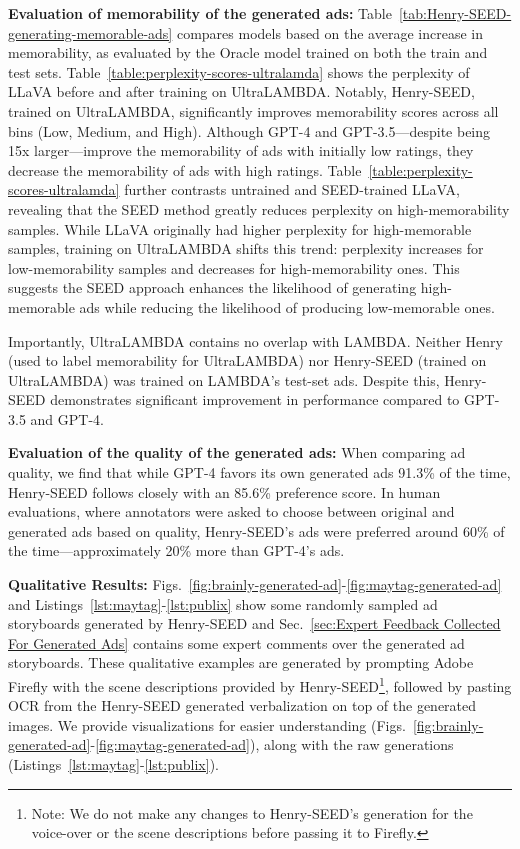 \textbf{Evaluation of memorability of the generated ads:} 
Table~\ref{tab:Henry-SEED-generating-memorable-ads} compares models based on the average increase in memorability, as evaluated by the Oracle model trained on both the train and test sets. Table~\ref{table:perplexity-scores-ultralamda} shows the perplexity of LLaVA before and after training on UltraLAMBDA. Notably, Henry-SEED, trained on UltraLAMBDA, significantly improves memorability scores across all bins (Low, Medium, and High). Although GPT-4 and GPT-3.5—despite being 15x larger—improve the memorability of ads with initially low ratings, they decrease the memorability of ads with high ratings. Table~\ref{table:perplexity-scores-ultralamda} further contrasts untrained and SEED-trained LLaVA, revealing that the SEED method greatly reduces perplexity on high-memorability samples. While LLaVA originally had higher perplexity for high-memorable samples, training on UltraLAMBDA shifts this trend: perplexity increases for low-memorability samples and decreases for high-memorability ones. This suggests the SEED approach enhances the likelihood of generating high-memorable ads while reducing the likelihood of producing low-memorable ones.


Importantly, UltraLAMBDA contains no overlap with LAMBDA. Neither Henry (used to label memorability for UltraLAMBDA) nor Henry-SEED (trained on UltraLAMBDA) was trained on LAMBDA’s test-set ads. Despite this, Henry-SEED demonstrates significant improvement in performance compared to GPT-3.5 and GPT-4.


\textbf{Evaluation of the quality of the generated ads:}
When comparing ad quality, we find that while GPT-4 favors its own generated ads 91.3\% of the time, Henry-SEED follows closely with an 85.6\% preference score. In human evaluations, where annotators were asked to choose between original and generated ads based on quality, Henry-SEED's ads were preferred around 60\% of the time—approximately 20\% more than GPT-4's ads.


\textbf{Qualitative Results:} Figs.~\ref{fig:brainly-generated-ad}-\ref{fig:maytag-generated-ad} and Listings~\ref{lst:maytag}-\ref{lst:publix} show some randomly sampled ad storyboards generated by Henry-SEED and Sec.~\ref{sec:Expert Feedback Collected For Generated Ads} contains some expert comments over the generated ad storyboards. These qualitative examples are generated by prompting Adobe Firefly \cite{adobefirefly} with the scene descriptions provided by Henry-SEED\footnote{Note: We do not make any changes to Henry-SEED's generation for the voice-over or the scene descriptions before passing it to Firefly.}, followed by pasting OCR from the Henry-SEED generated verbalization on top of the generated images. %
We provide visualizations for easier understanding (Figs.~\ref{fig:brainly-generated-ad}-\ref{fig:maytag-generated-ad}), along with the raw generations (Listings~\ref{lst:maytag}-\ref{lst:publix}). 

